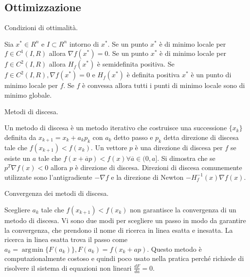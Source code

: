 \documentclass[answers, a4paper]{exam}
\DeclareMathOperator*{\argmin}{\arg\!\min}
\begin{document}
\begin{questions}
\section{Ottimizzazione}
\question Condizioni di ottimalità.
\begin{solution}
	Sia $x^* \in R^n$ e $I \subset R^n$ intorno di $x^*$.
	Se un punto $x^*$ è di minimo locale per $f\in C^1(I, R)$ allora $\nabla f(x^*) = 0$.
	Se un punto $x^*$ è di minimo locale per $f\in C^2(I, R)$ allora $H_f(x^*)$ è semidefinita positiva.
	Se $f\in C^2(I, R), \nabla f(x^*) = 0$ e $H_f(x^*)$ è definita positiva $x^*$ è un punto di minimo locale per $f$.
	Se $f$ è convessa allora tutti i punti di minimo locale sono di minimo globale. 
\end{solution}
\question Metodi di discesa. 
\begin{solution}
	Un metodo di discesa è un metodo iterativo che costruisce una successione $\{x_k\}$ definita da $x_{k + 1} = x_k + a_k p_k$ con $a_k$ detto passo e $p_k$ detta direzione di discesa tale che $f(x_{k + 1}) < f(x_k)$.
	Un vettore $p$ è una direzione di discesa per $f$ se esiste un $a$ tale che $f(x + \overline{a} p) < f(x) \forall \overline{a} \in (0, a]$. 
	Si dimostra che se $p^T\nabla f(x) < 0$ allora $p$ è direzione di discesa.
	Direzioni di discesa comunemente utilizzate sono l'antigradiente $-\nabla f$ e la direzione di Newton $-H_f^{-1}(x) \nabla f(x)$.
	
\end{solution}
\question Convergenza dei metodi di discesa.
\begin{solution}
	Scegliere $a_k$ tale che $f(x_{k+1}) < f(x_k)$ non garantisce la convergenza di un metodo di discesa. 
	Vi sono due modi per scegliere un passo in modo da garantire la convergenza, che prendono il nome di ricerca in linea esatta e inesatta.
	La ricerca in linea esatta trova il passo come $a_k = \argmin \{F(a_k)\}, F(a_k) = f(x_k + ap)$.
	Questo metodo è computazionalmente costoso e quindi poco usato nella pratica perché richiede di risolvere il sistema di equazioni non lineari $\frac{dF}{da} = 0$. 


\end{solution}
\end{questions}
\end{document}
